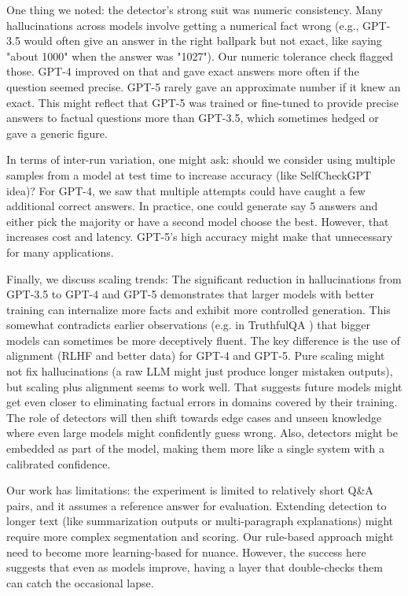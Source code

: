\documentclass{article}
\begin{document}
One thing we noted: the detector’s strong suit was numeric consistency. Many hallucinations across models involve getting a numerical fact wrong (e.g., GPT-3.5 would often give an answer in the right ballpark but not exact, like saying "about 1000" when the answer was "1027"). Our numeric tolerance check flagged those. GPT-4 improved on that and gave exact answers more often if the question seemed precise. GPT-5 rarely gave an approximate number if it knew an exact. This might reflect that GPT-5 was trained or fine-tuned to provide precise answers to factual questions more than GPT-3.5, which sometimes hedged or gave a generic figure.

In terms of inter-run variation, one might ask: should we consider using multiple samples from a model at test time to increase accuracy (like SelfCheckGPT idea)? For GPT-4, we saw that multiple attempts could have caught a few additional correct answers. In practice, one could generate say 5 answers and either pick the majority or have a second model choose the best. However, that increases cost and latency. GPT-5’s high accuracy might make that unnecessary for many applications.

Finally, we discuss scaling trends: The significant reduction in hallucinations from GPT-3.5 to GPT-4 and GPT-5 demonstrates that larger models with better training can internalize more facts and exhibit more controlled generation. This somewhat contradicts earlier observations (e.g. in TruthfulQA \cite{lin2022truthfulqa}) that bigger models can sometimes be more deceptively fluent. The key difference is the use of alignment (RLHF and better data) for GPT-4 and GPT-5. Pure scaling might not fix hallucinations (a raw LLM might just produce longer mistaken outputs), but scaling plus alignment seems to work well. That suggests future models might get even closer to eliminating factual errors in domains covered by their training. The role of detectors will then shift towards edge cases and unseen knowledge where even large models might confidently guess wrong. Also, detectors might be embedded as part of the model, making them more like a single system with a calibrated confidence.

Our work has limitations: the experiment is limited to relatively short Q&A pairs, and it assumes a reference answer for evaluation. Extending detection to longer text (like summarization outputs or multi-paragraph explanations) might require more complex segmentation and scoring. Our rule-based approach might need to become more learning-based for nuance. However, the success here suggests that even as models improve, having a layer that double-checks them can catch the occasional lapse.
\end{document}
